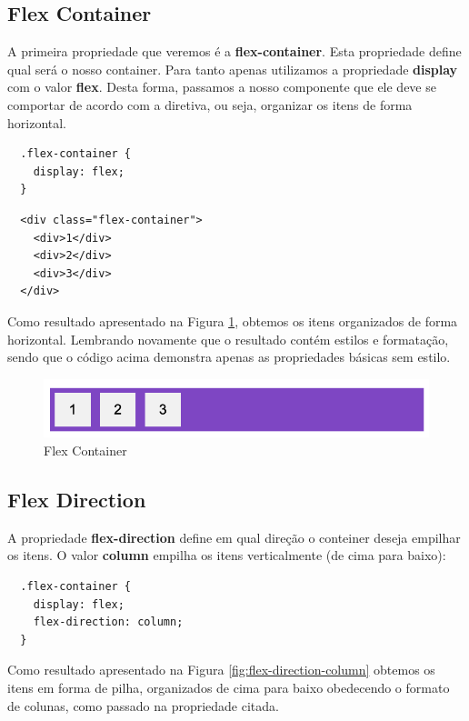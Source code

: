 \subsection{Flex Container}

A primeira propriedade que veremos é a \textbf{flex-container}. Esta propriedade define qual será o nosso container. Para tanto apenas utilizamos a propriedade \textbf{display} com o valor \textbf{flex}. Desta forma, passamos a nosso componente que ele deve se comportar de acordo com a diretiva, ou seja, organizar os itens de forma horizontal.

\begin{lstlisting}
  .flex-container {
    display: flex;
  } 
\end{lstlisting}

\begin{lstlisting}
  <div class="flex-container">
    <div>1</div>
    <div>2</div>
    <div>3</div>
  </div>
\end{lstlisting}

Como resultado apresentado na Figura \ref{fig:flex-container}, obtemos os itens organizados de forma horizontal. Lembrando novamente que o resultado contém estilos e formatação, sendo que o código acima demonstra apenas as propriedades básicas sem estilo.

\begin{figure}[H]
  \centering
  \includegraphics[scale=0.5]{imagens/flex-container.png}
  \caption{Flex Container}
  \label{fig:flex-container}
\end{figure}

\subsection{Flex Direction}

A propriedade \textbf{flex-direction} define em qual direção o conteiner deseja empilhar os itens. O valor \textbf{column} empilha os itens verticalmente (de cima para baixo):

\begin{lstlisting}
  .flex-container {
    display: flex;
    flex-direction: column;
  } 
\end{lstlisting}

Como resultado apresentado na Figura \ref{fig:flex-direction-column} obtemos os itens em forma de pilha, organizados de cima para baixo obedecendo o formato de colunas, como passado na propriedade citada.

